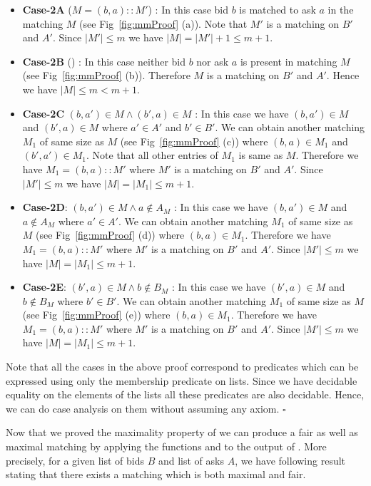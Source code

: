 \documentclass[a4paper,UKenglish,cleveref, autoref]{lipics-v2019}
\begin{document}
\begin{itemize}
\begin{itemize}
\item \textbf{Case-2A} ($M = (b,a)::M'$) : In this case  bid $b$ is matched to ask $a$ in the matching $M$ (see Fig~\ref{fig:mmProof} (a)). Note that $M'$ is a matching on $B'$ and $A'$. Since $|M'| \leq m$ we have $|M|= |M'|+1 \leq m+1$.
\item \textbf{Case-2B} () : In this case neither bid $b$ nor ask $a$ is present in matching $M$ (see Fig~\ref{fig:mmProof} (b)). Therefore $M$ is a matching on $B'$ and $A'$. Hence we have $|M| \leq m < m+1$.
\item \textbf{Case-2C} $(b,a') \in M \land (b',a) \in M$ : In this case we have $(b,a') \in M$ and  $(b',a) \in M$ where $a' \in A'$ and $b' \in B'$. We can obtain another matching $M_1$ of same size as $M$ (see Fig~\ref{fig:mmProof} (c)) where $(b,a) \in M_1$ and $(b',a') \in M_1$. Note that all other entries of $M_1$ is same as $M$. Therefore we have $M_1 = (b,a)::M'$ where $M'$ is a matching on $B'$ and $A'$. Since $|M'| \leq m$ we have $|M|=|M_1| \leq m+1$.
\item \textbf{Case-2D}: $(b,a')\in M \land a \notin A_M$ : In this case we have $(b,a')\in M$ and $a \notin A_M$ where $a'\in A'$. We can obtain another matching $M_1$ of same size as $M$ (see Fig~\ref{fig:mmProof} (d)) where $(b,a) \in M_1$. 
Therefore we have $M_1 = (b,a)::M'$ where $M'$ is a matching on $B'$ and $A'$.
Since $|M'| \leq m$ we have $|M|=|M_1| \leq m+1$.
\item \textbf{Case-2E}: $(b',a)\in M \land b \notin B_M$ : In this case we have $(b',a)\in M$ and $b \notin B_M$ where $b'\in B'$. We can obtain another matching $M_1$ of same size as $M$ (see Fig~\ref{fig:mmProof} (e)) where $(b,a) \in M_1$. 
Therefore we have $M_1 = (b,a)::M'$ where $M'$ is a matching on $B'$ and $A'$.
Since $|M'| \leq m$ we have $|M|=|M_1| \leq m+1$.
\end{itemize}
\end{itemize}
Note that all the cases in the above proof correspond to  predicates which can be expressed using  only the membership predicate on lists. Since we have  decidable equality on the elements of the lists all these predicates are also decidable. Hence, we can do case analysis on them without assuming any axiom. $\square$

Now that we  proved the maximality property of   we can produce a fair as well as maximal matching by applying the functions   and  to the output of . More precisely, for a given list of bids $B$ and list of asks $A$, we have  following result stating that there exists a matching which is both maximal and fair. 
\end{document}
